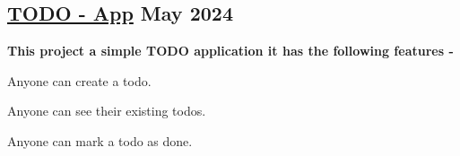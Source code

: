 \subsection{{\href{https://github.com/mrsamirr/todo-app}{TODO - App} \hfill May 2024 }}
\begin{zitemize}
\item {\textbf{This project a simple TODO application it has the following features -}}
\item Anyone can create a todo.
\item Anyone can see their existing todos.
\item Anyone can mark a todo as done.

\end{zitemize}



